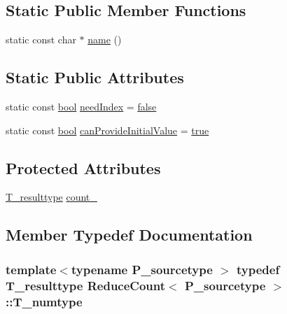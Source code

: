 \subsection*{Static Public Member Functions}
\begin{DoxyCompactItemize}
\item 
static const char $\ast$ \hyperlink{classReduceCount_a41398a6d3089974241d69e6dbcd5c6ae}{name} ()
\end{DoxyCompactItemize}
\subsection*{Static Public Attributes}
\begin{DoxyCompactItemize}
\item 
static const \hyperlink{compiler_8h_abb452686968e48b67397da5f97445f5b}{bool} \hyperlink{classReduceCount_a21a0b77e29742867419fa7001472b5be}{need\+Index} = \hyperlink{compiler_8h_a65e9886d74aaee76545e83dd09011727}{false}
\item 
static const \hyperlink{compiler_8h_abb452686968e48b67397da5f97445f5b}{bool} \hyperlink{classReduceCount_ae813167cbdc36397f1488fd05ad5840d}{can\+Provide\+Initial\+Value} = \hyperlink{compiler_8h_a41f9c5fb8b08eb5dc3edce4dcb37fee7}{true}
\end{DoxyCompactItemize}
\subsection*{Protected Attributes}
\begin{DoxyCompactItemize}
\item 
\hyperlink{classReduceCount_aeca4c153ec33e643b9104184d7d7d240}{T\+\_\+resulttype} \hyperlink{classReduceCount_ac07a02efbce10910a7ab991b681de1e1}{count\+\_\+}
\end{DoxyCompactItemize}


\subsection{Member Typedef Documentation}
\hypertarget{classReduceCount_a5167d1d7427f26f792d3fa26e77f9a1a}{}
\subsubsection[{T\+\_\+numtype}]{\setlength{\rightskip}{0pt plus 5cm}template$<$typename P\+\_\+sourcetype $>$ typedef {\bf T\+\_\+resulttype} {\bf Reduce\+Count}$<$ P\+\_\+sourcetype $>$\+::{\bf T\+\_\+numtype}}\label{classReduceCount_a5167d1d7427f26f792d3fa26e77f9a1a}
\hypertarget{classReduceCount_aeca4c153ec33e643b9104184d7d7d240}{}
